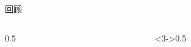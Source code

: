 \begin{frame}{回顾}
  \begin{columns}
    \begin{column}{0.5\textwidth}
      \tableofcontents[pausesections]
    \end{column}
    \pause
    \begin{column}<3->{0.5\textwidth}
    \end{column}
  \end{columns}
\end{frame}



